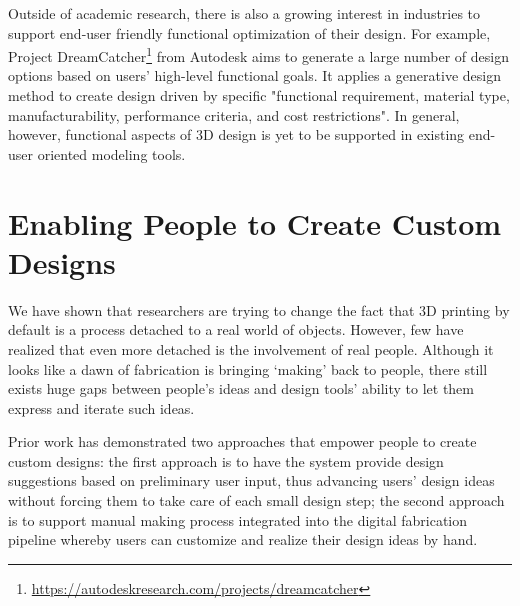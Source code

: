 Outside of academic research, there is also a growing interest in industries to support end-user friendly functional optimization of their design. For example, Project DreamCatcher\footnote{\url{https://autodeskresearch.com/projects/dreamcatcher}} from Autodesk aims to generate a large number of design options based on users' high-level functional goals. It applies a generative design method to create design driven by specific "functional requirement, material type, manufacturability, performance criteria, and cost restrictions". In general, however, functional aspects of 3D design is yet to be supported in existing end-user oriented modeling tools.

\section{Enabling People to Create Custom Designs}
We have shown that researchers are trying to change the fact that 3D printing by default is a process detached to a real world of objects. However, few have realized that even more detached is the involvement of real people. Although it looks like a dawn of fabrication is bringing `making' back to people, there still exists huge gaps between people's ideas and design tools' ability to let them express and iterate such ideas.

Prior work has demonstrated two approaches that empower people to create custom designs: the first approach is to have the system provide design suggestions based on preliminary user input, thus advancing users' design ideas without forcing them to take care of each small design step; the second approach is to support manual making process integrated into the digital fabrication pipeline whereby users can customize and realize their design ideas by hand.

